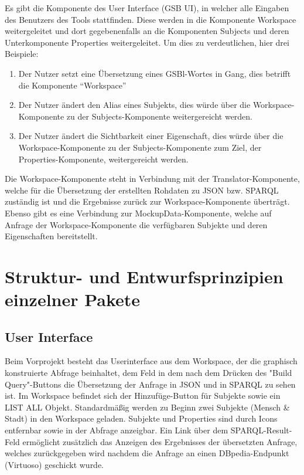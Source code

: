 Es gibt die Komponente des User Interface (GSB UI), in welcher alle
Eingaben des Benutzers des Tools stattfinden. Diese werden in die
Komponente Workspace weitergeleitet und dort gegebenenfalls an die
Komponenten Subjects und deren Unterkomponente Properties
weitergeleitet. Um dies zu verdeutlichen, hier drei Beispiele:
\begin{enumerate}
\item Der Nutzer setzt eine Übersetzung eines GSBl-Wortes in Gang, dies betrifft die Komponente “Workspace”
\item Der Nutzer ändert den Alias eines Subjekts, dies würde über die Workspace-Komponente zu der Subjects-Komponente weitergereicht werden.
\item Der Nutzer ändert die Sichtbarkeit einer Eigenschaft, dies würde über die Workspace-Komponente zu der Subjects-Komponente zum Ziel, der Properties-Komponente, weitergereicht werden.
\end{enumerate}
Die Workspace-Komponente steht in Verbindung mit der
Translator-Komponente, welche für die Übersetzung der erstellten
Rohdaten zu JSON bzw. SPARQL zuständig ist und die Ergebnisse zurück
zur Workspace-Komponente überträgt.
Ebenso gibt es eine Verbindung zur MockupData-Komponente, welche auf Anfrage der Workspace-Komponente die verfügbaren Subjekte und deren Eigenschaften bereitstellt.


\section{Struktur- und Entwurfsprinzipien einzelner Pakete}

\subsection*{User Interface}

Beim Vorprojekt besteht das Userinterface aus dem Workspace, der die graphisch konstruierte Abfrage beinhaltet, dem Feld in dem nach dem Drücken des "Build Query"-Buttons die Übersetzung der Anfrage in JSON und in SPARQL zu sehen ist. Im Workspace befindet sich der Hinzufüge-Button für Subjekte sowie ein LIST ALL Objekt. Standardmäßig werden zu Beginn zwei Subjekte (Mensch \& Stadt) in den Workspace geladen. Subjekte und Properties sind durch Icons entfernbar sowie in der Abfrage anzeigbar.
Ein Link über dem SPARQL-Result-Feld ermöglicht zusätzlich das Anzeigen des Ergebnisses der übersetzten Anfrage, welches zurückgegeben wird nachdem die Anfrage an einen DBpedia-Endpunkt (Virtuoso) geschickt wurde.

